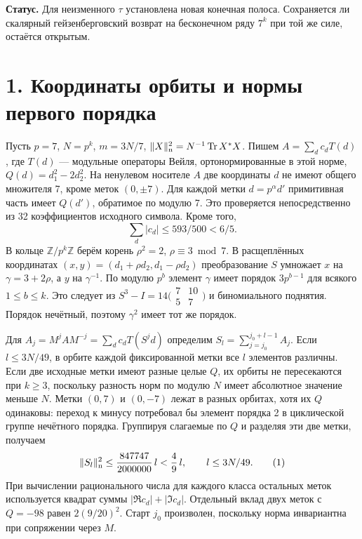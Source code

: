 \documentclass[11pt,a4paper]{article}
\newcommand{\Tr}{\operatorname{Tr}}
\newcommand{\Z}{\mathbb Z}
\newcommand{\sect}[1]{\section*{\sffamily\color{ink}#1}}
\begin{document}
\textbf{Статус.} Для неизменного $\tau$ установлена новая конечная полоса. Сохраняется ли скалярный гейзенберговский возврат на бесконечном ряду $7^k$ при той же силе, остаётся открытым.
\newpage
\sect{1. Координаты орбиты и нормы первого порядка}
Пусть $p=7$, $N=p^k$, $m=3N/7$, $\|X\|_{\rm n}^2=N^{-1}\Tr X^*X$. Пишем $A=\sum_d c_d T(d)$, где $T(d)$ --- модульные операторы Вейля, ортонормированные в этой норме, $Q(d)=d_1^2-2d_2^2$. На ненулевом носителе $A$ две координаты $d$ не имеют общего множителя 7, кроме меток $(0,\pm7)$. Для каждой метки $d=p^\alpha d'$ примитивная часть имеет $Q(d')$, обратимое по модулю 7. Это проверяется непосредственно из 32 коэффициентов исходного символа. Кроме того,
\[
              \sum_d |c_d|\le 593/500<6/5 .
\]
В кольце $\Z/p^k\Z$ берём корень $\rho^2=2$, $\rho\equiv3\bmod7$. В расщеплённых координатах $(x,y)=(d_1+\rho d_2,d_1-\rho d_2)$ преобразование $S$ умножает $x$ на $\gamma=3+2\rho$, а $y$ на $\gamma^{-1}$. По модулю $p^b$ элемент $\gamma$ имеет порядок $3p^{b-1}$ для всякого $1\le b\le k$. Это следует из $S^3-I=14\bigl(\begin{smallmatrix}7&10\\5&7\end{smallmatrix}\bigr)$ и биномиального поднятия. Порядок нечётный, поэтому $\gamma^2$ имеет тот же порядок.

Для $A_j=M^j A M^{-j}=\sum_d c_d T(S^jd)$ определим $S_l=\sum_{j=j_0}^{j_0+l-1} A_j$. Если $l\le3N/49$, в орбите каждой фиксированной метки все $l$ элементов различны. Если две исходные метки имеют разные целые $Q$, их орбиты не пересекаются при $k\ge3$, поскольку разность норм по модулю $N$ имеет абсолютное значение меньше $N$. Метки $(0,7)$ и $(0,-7)$ лежат в разных орбитах, хотя их $Q$ одинаковы: переход к минусу потребовал бы элемент порядка 2 в циклической группе нечётного порядка. Группируя слагаемые по $Q$ и разделяя эти две метки, получаем
\[
       \|S_l\|_{\rm n}^2
          \le \frac{847747}{2000000}\,l
          < \frac49\,l,\qquad l\le 3N/49 .                          \tag{1}
\]
При вычислении рационального числа для каждого класса остальных меток используется квадрат суммы $|\Re c_d|+|\Im c_d|$. Отдельный вклад двух меток с $Q=-98$ равен $2(9/20)^2$. Старт $j_0$ произволен, поскольку норма инвариантна при сопряжении через $M$.
\end{document}
